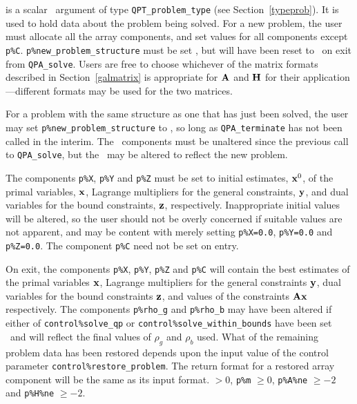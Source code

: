 \documentclass{galahad}
\newcommand{\packagename}{QPA}
\begin{document}
\vspace*{-3mm}
\begin{description}
 is a scalar \intentinout\ argument of type 
{\tt QPT\_problem\_type}
(see Section~\ref{typeprob}). 
It is used to hold data about the problem being solved.
For a new problem, the user must allocate all the array components,
and set values for all components except {\tt p\%C}.
{\tt p\%new\_problem\_structure} must be set \true, but will have been reset
to \false\ on exit from {\tt \packagename\_solve}.
Users are free to choose whichever
of the matrix formats described in Section~\ref{galmatrix} 
is appropriate for ${\mathbf{A}}$ and ${\mathbf{H}}$ for their application---different 
formats may be used for the two matrices.

For a problem with the same structure as one that has just been 
solved, the user may set {\tt p\%new\_problem\_str\-u\-cture} to \false,
so long as {\tt \packagename\_terminate} has not been called in the interim.
The \integer\ components must be unaltered since the
previous call to {\tt \packagename\_solve}, but the \realdp\ 
may be altered to reflect the new problem.

The components {\tt p\%X}, {\tt p\%Y} and {\tt p\%Z}
must be set to initial estimates, ${\mathbf{x}}^{0}$, of the primal variables, 
${\mathbf{x}}$, Lagrange multipliers for the general constraints, ${\mathbf{y}}$, 
and dual variables for the bound constraints, ${\mathbf{z}}$, respectively.
Inappropriate initial values will be altered, so the user should
not be overly concerned if suitable values are not apparent, and may be
content with merely setting {\tt p\%X=0.0},
{\tt p\%Y=0.0} and {\tt p\%Z=0.0}.
The component {\tt p\%C} need not be set on entry.

On exit, the components {\tt p\%X}, {\tt p\%Y}, {\tt p\%Z} and {\tt p\%C}
will contain the best estimates of the primal variables ${\mathbf{x}}$, 
Lagrange multipliers for the general
constraints ${\mathbf{y}}$, dual variables for the bound constraints ${\mathbf{z}}$, 
and values of the constraints ${\mathbf{A}} {\mathbf{x}}$ respectively.
The components {\tt p\%rho\_g} and {\tt p\%rho\_b} may have been altered if 
either of {\tt control\%solve\_qp} or {\tt control\%solve\_within\_bounds} 
have been set \true\ and will reflect the final values of $\rho_g$ and $\rho_b$
used. What of the remaining problem data has been restored depends upon
the input value of the control parameter {\tt control\%restore\_problem}.
The return format for a restored array component will be the same as its
input format.
 $> 0$, {\tt p\%m} $\geq 0$,
              {\tt p\%A\%ne} $\geq -2$ and {\tt p\%H\%ne} $\geq -2$.


\end{description}
\end{document}
